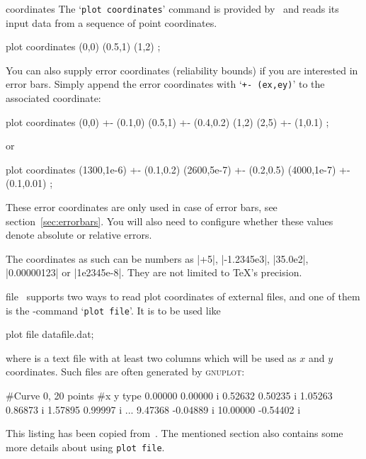 \begin{addplotoperation}[noindex]{coordinates}{}
The `\texttt{plot coordinates}' command is provided by \Tikz\ and reads its input data from a sequence of point coordinates.
\begin{codeexample}
\addplot plot coordinates {
	(0,0)
	(0.5,1)
	(1,2)
};
\end{codeexample}

You can also supply error coordinates (reliability bounds) if you are interested in error bars. Simply append the error coordinates with `\texttt{+- (ex,ey)}' to the associated coordinate:
\begin{codeexample}
\addplot plot coordinates {
	(0,0) +- (0.1,0)
	(0.5,1) +- (0.4,0.2)
	(1,2)
	(2,5) +- (1,0.1)
};
\end{codeexample}
or 
\begin{codeexample}
\addplot plot coordinates {
	(1300,1e-6) +- (0.1,0.2)
	(2600,5e-7) +- (0.2,0.5)
	(4000,1e-7) +- (0.1,0.01)
};
\end{codeexample}
These error coordinates are only used in case of error bars, see section~\ref{sec:errorbars}. You will also need to configure whether these values denote absolute or relative errors.

The coordinates as such can be numbers as |+5|, |-1.2345e3|, |35.0e2|, |0.00000123| or |1e2345e-8|. They are not limited to \TeX's precision.
\end{addplotoperation}


\begin{addplotoperation}[noindex]{file}{}
\PGFPlots\ supports two ways to read plot coordinates of external files, and one of them is the \Tikz-command `\texttt{plot file}'. It is to be used like
\begin{codeexample}
\addplot plot file {datafile.dat};
\end{codeexample}
where  is a text file with at least two columns which will be used as $x$ and $y$ coordinates. Such files are often generated by \textsc{gnuplot}:
\begin{codeexample}
#Curve 0, 20 points
#x y type
0.00000 0.00000 i
0.52632 0.50235 i
1.05263 0.86873 i
1.57895 0.99997 i
...
9.47368 -0.04889 i
10.00000 -0.54402 i
\end{codeexample}
This listing has been copied from~\cite[section~16.4]{tikz}. The mentioned section also contains some more details about using \texttt{plot file}.
\end{addplotoperation}

